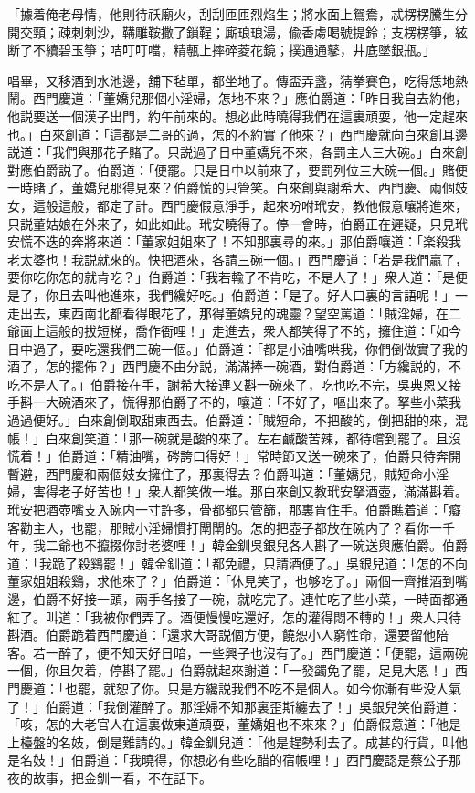 \begin{myquote}
「據着俺老母情，他則待祅廟火，刮刮匝匝烈焰生；將水面上鴛鴦，忒楞楞騰生分開交頸；疎刺刺沙，鞲雕鞍撒了鎖鞓；廝琅琅湯，偸香䖏喝號提鈴；支楞楞箏，絃断了不續碧玉箏；咭叮叮噹，精甎上摔碎菱花鏡；撲通通鼕，井底墜銀瓶。」
\end{myquote}

唱畢，又移酒到水池邊，舖下毡單，都坐地了。傳盃弄盞，猜拳賽色，吃得恁地熱鬧。西門慶道：「董嬌兒那個小淫婦，怎地不來？」應伯爵道：「昨日我自去約他，他説要送一個漢子出門，約午前來的。想必此時曉得我們在這裏頑耍，他一定趕來也。」白來創道：「這都是二哥的過，怎的不約實了他來？」西門慶就向白來創耳邊説道：「我們與那花子賭了。只説過了日中董嬌兒不來，各罰主人三大碗。」白來創對應伯爵説了。伯爵道：「便罷。只是日中以前來了，要罰列位三大碗一個。」賭便一時賭了，董嬌兒那得見來？伯爵慌的只管笑。白來創與謝希大、西門慶、兩個妓女，這般這般，都定了計。西門慶假意淨手，起來吩咐玳安，教他假意嚷將進來，只説董姑娘在外來了，如此如此。玳安曉得了。停一會時，伯爵正在遲疑，只見玳安慌不迭的奔將來道：「董家姐姐來了！不知那裏尋的來。」那伯爵嚷道：「楽殺我老太婆也！我説就來的。快把酒來，各請三碗一個。」西門慶道：「若是我們贏了，要你吃你怎的就肯吃？」伯爵道：「我若輸了不肯吃，不是人了！」衆人道：「是便是了，你且去叫他進來，我們纔好吃。」伯爵道：「是了。好人口裏的言語呢！」一走出去，東西南北都看得眼花了，那得董嬌兒的魂靈？望空罵道：「賊淫婦，在二爺面上這般的拔短梯，喬作衙哩！」走進去，衆人都笑得了不的，擁住道：「如今日中過了，要吃還我們三碗一個。」伯爵道：「都是小油嘴哄我，你們倒做實了我的酒了，怎的擺佈？」西門慶不由分説，滿滿捧一碗酒，對伯爵道：「方纔説的，不吃不是人了。」伯爵接在手，謝希大接連又斟一碗來了，吃也吃不完，吳典恩又接手斟一大碗酒來了，慌得那伯爵了不的，嚷道：「不好了，嘔出來了。拏些小菜我過過便好。」白來創倒取甜東西去。伯爵道：「賊短命，不把酸的，倒把甜的來，混帳！」白來創笑道：「那一碗就是酸的來了。左右鹹酸苦辣，都待嚐到罷了。且沒慌着！」伯爵道：「精油嘴，硶誇口得好！」常時節又送一碗來了，伯爵只待奔開暫避，西門慶和兩個妓女擁住了，那裏得去？伯爵叫道：「董嬌兒，賊短命小淫婦，害得老子好苦也！」衆人都笑做一堆。那白來創又教玳安拏酒壺，滿滿斟着。玳安把酒壺嘴支入碗内一寸許多，骨都都只管篩，那裏肯住手。伯爵瞧着道：「癡客勸主人，也罷，那賊小淫婦慣打閛閛的。怎的把壺子都放在碗内了？看你一千年，我二爺也不攛掇你討老婆哩！」韓金釧吳銀兒各人斟了一碗送與應伯爵。伯爵道：「我跪了殺鷄罷！」韓金釧道：「都免禮，只請酒便了。」吳銀兒道：「怎的不向董家姐姐殺鷄，求他來了？」伯爵道：「休見笑了，也够吃了。」兩個一齊推酒到嘴邊，伯爵不好接一頭，兩手各接了一碗，就吃完了。連忙吃了些小菜，一時面都通紅了。叫道：「我被你們弄了。酒便慢慢吃還好，怎的灌得悶不轉的！」衆人只待斟酒。伯爵跪着西門慶道：「還求大哥説個方便，饒恕小人窮性命，還要留他陪客。若一醉了，便不知天好日暗，一些興子也沒有了。」西門慶道：「便罷，這兩碗一個，你且欠着，停斟了罷。」伯爵就起來謝道：「一發蠲免了罷，足見大恩！」西門慶道：「也罷，就恕了你。只是方纔説我們不吃不是個人。如今你漸有些没人氣了！」伯爵道：「我倒灌醉了。那淫婦不知那裏歪斯纏去了！」吳銀兒笑伯爵道：「咳，怎的大老官人在這裏做東道頑耍，董嬌姐也不來來？」伯爵假意道：「他是上檯盤的名妓，倒是難請的。」韓金釧兒道：「他是趕勢利去了。成甚的行貨，叫他是名妓！」伯爵道：「我曉得，你想必有些吃醋的宿帳哩！」西門慶認是蔡公子那夜的故事，把金釧一看，不在話下。

